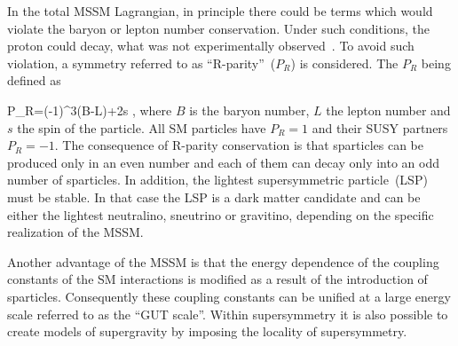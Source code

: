 



In the total MSSM Lagrangian, in principle there could be terms which would violate the baryon or lepton number conservation. Under such conditions, the proton could decay, what was not experimentally observed~\cite{Nishino:2009aa}. To avoid such violation, a symmetry referred to as ``R-parity''~($P_{R}$) is considered. The $P_{R}$ being defined as

{
P_R=(-1)^{3(B-L)+2s },
}
where $B$ is the baryon number, $L$ the lepton number and $s$ the spin of the particle. All SM particles have $P_{R}=1$ and their SUSY partners $P_{R}=-1$. The consequence of R-parity conservation is that sparticles can be produced only in an even number and each of them can decay only into an odd number of sparticles. In addition, the lightest supersymmetric particle~(LSP) must be stable. In that case the LSP is a dark matter candidate and can be either the lightest neutralino, sneutrino or gravitino, depending on the specific realization of the MSSM. 

Another advantage of the MSSM is that the energy dependence of the coupling constants of the SM interactions is modified as a result of the introduction of sparticles. Consequently these coupling constants can be unified at a large energy scale referred to as  the ``GUT scale''. Within supersymmetry it is also possible to create models of supergravity by imposing the locality of supersymmetry.



